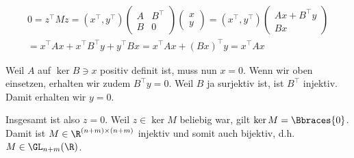 \begin{solution}
\begin{enumerate}[label = \textbf{\alph*)}]
\begin{itemize}
    \begin{multline*}
      0 =
      z^\top M z
      =
      (x^\top, y^\top)
      \begin{pmatrix}
        A & B^\top \\
        B & 0
      \end{pmatrix}
      \begin{pmatrix}
        x \\ y
      \end{pmatrix}
      =
      (x^\top, y^\top)
      \begin{pmatrix}
        A x + B^\top y \\
        B x
      \end{pmatrix} \\
      =
      x^\top A x + x^\top B^\top y + y^\top B x
      =
      x^\top A x + (B x)^\top y
      =
      x^\top A x
    \end{multline*}

    Weil $A$ auf $\ker B \ni x$ positiv definit ist, muss nun $x = 0$.
    Wenn wir oben einsetzen, erhalten wir zudem $B^\top y = 0$.
    Weil $B$ ja surjektiv ist, ist $B^\top$ injektiv.
    Damit erhalten wir $y = 0$.

    Insgesamt ist also $z = 0$.
    Weil $z \in \ker M$ beliebig war, gilt $\ker M = \Bbraces{0}$.
    Damit ist $M \in \R^{(n+m) \times (n+m)}$ injektiv und somit auch bijektiv, d.h. $M \in \GL_{n + m}(\R)$.

  \end{itemize}

\end{enumerate}

\end{solution}

